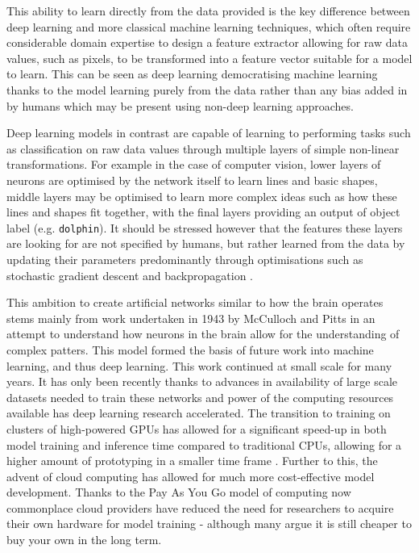 This ability to learn directly from the data provided is the key difference between deep learning and more classical machine learning techniques, which often require considerable domain expertise to design a feature extractor allowing for raw data values, such as pixels, to be transformed into a feature vector suitable for a model to learn. This can be seen as deep learning democratising machine learning thanks to the model learning purely from the data rather than any bias added in by humans which may be present using non-deep learning approaches.

Deep learning models in contrast are capable of learning to performing tasks such as classification on raw data values through multiple layers of simple non-linear transformations. For example in the case of computer vision, lower layers of neurons are optimised by the network itself to learn lines and basic shapes, middle layers may be optimised to learn more complex ideas such as how these lines and shapes fit together, with the final layers providing an output of object label (e.g. \texttt{dolphin}). It should be stressed however that the features these layers are looking for are not specified by humans, but rather learned from the data by updating their parameters predominantly through optimisations such as stochastic gradient descent and backpropagation \cite{hecht-nielsen_iii.3_1992}.

This ambition to create artificial networks similar to how the brain operates stems mainly from work undertaken in 1943 by McCulloch and Pitts \cite{mcculloch_logical_1943} in an attempt to understand how neurons in the brain allow for the understanding of complex patters. This model formed the basis of future work into machine learning, and thus deep learning. This work continued at small scale for many years. It has only been recently thanks to advances in availability of large scale datasets needed to train these networks and power of the computing resources available has deep learning research accelerated. The transition to training on clusters of high-powered GPUs has allowed for a significant speed-up in both model training and inference time compared to traditional CPUs, allowing for a higher amount of prototyping in a smaller time frame \cite{luo_artificial_2005}. Further to this, the advent of cloud computing has allowed for much more cost-effective model development. Thanks to the Pay As You Go model of computing now commonplace cloud providers have reduced the need for researchers to acquire their own hardware for model training - although many argue it is still cheaper to buy your own in the long term. 

